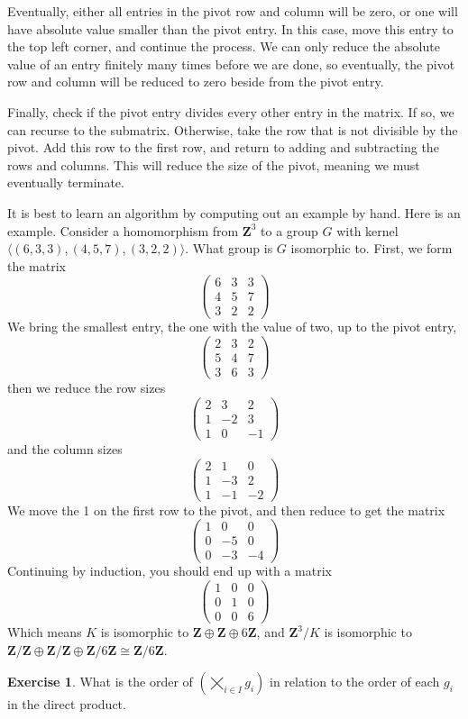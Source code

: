\documentclass[12pt]{amsbook}
\theoremstyle{definition}
\newtheorem{exercise}{Exercise}[chapter]
\newcommand{\bint}{\mathbf{Z}} %
\newcommand{\gen}[1]{\langle #1 \rangle} %
\begin{document}
Eventually, either all entries in the pivot row and column will be zero, or one will have absolute value smaller than the pivot entry. In this case, move this entry to the top left corner, and continue the process. We can only reduce the absolute value of an entry finitely many times before we are done, so eventually, the pivot row and column will be reduced to zero beside from the pivot entry.

Finally, check if the pivot entry divides every other entry in the matrix. If so, we can recurse to the submatrix. Otherwise, take the row that is not divisible by the pivot. Add this row to the first row, and return to adding and subtracting the rows and columns. This will reduce the size of the pivot, meaning we must eventually terminate.

It is best to learn an algorithm by computing out an example by hand. Here is an example. Consider a homomorphism from $\bint^3$ to a group $G$ with kernel $\gen{(6,3,3),(4,5,7),(3,2,2)}$. What group is $G$ isomorphic to. First, we form the matrix
%
\[ \begin{pmatrix} 6 & 3 & 3 \\ 4 & 5 & 7 \\ 3 & 2 & 2 \end{pmatrix} \]
%
We bring the smallest entry, the one with the value of two, up to the pivot entry,
%
\[ \begin{pmatrix} 2 & 3 & 2\\ 5 & 4 & 7\\ 3 & 6 & 3 \end{pmatrix} \]
%
then we reduce the row sizes
%
\[ \begin{pmatrix} 2 & 3 & 2\\ 1 & -2 & 3\\1 & 0 & -1 \end{pmatrix} \]
%
and the column sizes
%
\[ \begin{pmatrix} 2 & 1 & 0\\ 1 & -3 & 2\\ 1 & -1 & -2 \end{pmatrix} \]
%
We move the 1 on the first row to the pivot, and then reduce to get the matrix
%
\[ \begin{pmatrix} 1 & 0 & 0\\ 0 & -5 & 0\\ 0 & -3 & -4 \end{pmatrix} \]
%
Continuing by induction, you should end up with a matrix
%
\[ \begin{pmatrix} 1 & 0 & 0\\ 0 & 1 & 0\\ 0 & 0 & 6 \end{pmatrix} \]
%
Which means $K$ is isomorphic to $\bint \oplus \bint \oplus 6\bint$, and $\bint^3/K$ is isomorphic to $\bint/\bint \oplus \bint/\bint \oplus \bint/6\bint \cong \bint/6\bint$.

\clearpage

\begin{exercise}
    What is the order of $(\bigtimes_{i \in I} g_i)$ in relation to the order of each $g_i$ in the direct product.
\end{exercise}

\printindex
\end{document}
